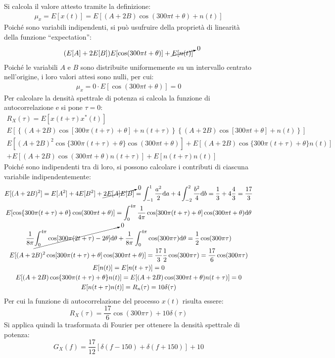 \documentclass{article}
\newcommand{\df}{\mathrm{d}}
\begin{document}
Si calcola il valore attesto tramite la definizione:
\begin{gather*}
    \mu_x=E[x(t)]=E[(A+2B)\cos(300\pi t+\theta)+n(t)]
\end{gather*}
Poiché sono variabili indipendenti, si può usufruire della proprietà di linearità della funzione ``expectation'':
\begin{gather*}
    (E[A]+2E[B])E[\cos(300\pi t+\theta)]+\cancelto{0}{E[n(t)]}
\end{gather*}
Poiché le variabili $A$ e $B$ sono distribuite uniformemente su un intervallo centrato nell'origine, i loro valori attesi sono nulli, per cui:
\begin{gather*}
    \mu_x=0\cdot E[\cos(300\pi t+\theta)]=0
\end{gather*}
Per calcolare la densità spettrale di potenza si calcola la funzione di autocorrelazione e si pone $\tau=0$:
\begin{gather*}
    R_X(\tau)=E[x(t+\tau)x^*(t)]\\
    E\left[\left\{(A+2B)\cos[300\pi (t+\tau)+\theta]+n(t+\tau)\right\}\left\{(A+2B)\cos[300\pi t+\theta]+n(t)\right\}\right]\\
    E[(A+2B)^2\cos\{300\pi(t+\tau)+\theta\}\cos(300\pi t+\theta)]+E[(A+2B)\cos\{300\pi (t+\tau)+\theta\}n(t)]\\
    +E[(A+2B)\cos(300\pi t+\theta)n(t+\tau)]+E[n(t+\tau)n(t)]
\end{gather*}
Poiché sono indipendenti tra di loro, si possono calcolare i contributi di ciascuna variabile indipendentemente:
\begin{gather*}
    E[(A+2B)^2]=E[A^2]+4E[B^2]+\cancelto{0}{2E[A]E[B]}=\displaystyle\int_{-1}^1\frac{a^2}{2}\df a+4\int_{-2}^{2}\frac{b^2}{4}\df b=\frac{1}{3}+4\frac{4}{3}=\frac{17}{3}\\
    E[\cos\{300\pi(t+\tau)+\theta\}\cos(300\pi t+\theta)]=\displaystyle\int_{0}^{4\pi}\frac{1}{4\pi}\cos[300\pi(t+\tau)+\theta]\cos(300\pi t+\theta)\df\theta\\
    \displaystyle\frac{1}{8\pi}\cancelto{0}{\int_{0}^{4\pi}\cos[300\pi(2t+\tau)-2\theta]\df\theta}+\frac{1}{8\pi}\int_0^{4\pi}\cos(300\pi \tau)\df\theta=\frac{1}{2}\cos(300\pi\tau)\\
    E[(A+2B)^2\cos[300\pi(t+\tau)+\theta]\cos(300\pi t+\theta)]=\displaystyle\frac{17}{3}\frac{1}{2}\cos(300\pi\tau)=\frac{17}{6}\cos(300\pi\tau)\\
    E[n(t)]=E[n(t+\tau)]=0\\
    E[(A+2B)\cos\{300\pi (t+\tau)+\theta\}n(t)]=E[(A+2B)\cos(300\pi t+\theta)n(t+\tau)]=0\\
    E[n(t+\tau)n(t)]=R_n(\tau)=10\delta(\tau)\\
\end{gather*}
Per cui la funzione di autocorrelazione del processo $x(t)$ risulta essere:
\begin{equation*}
    R_X(\tau)=\displaystyle\frac{17}{6}\cos(300\pi\tau)+10\delta(\tau)
\end{equation*}
Si applica quindi la trasformata di Fourier per ottenere la densità spettrale di potenza:
\begin{equation}
    G_X(f)=\displaystyle\frac{17}{12}\left[\delta(f-150)+\delta(f+150)\right]+10
\end{equation}
\end{document}
